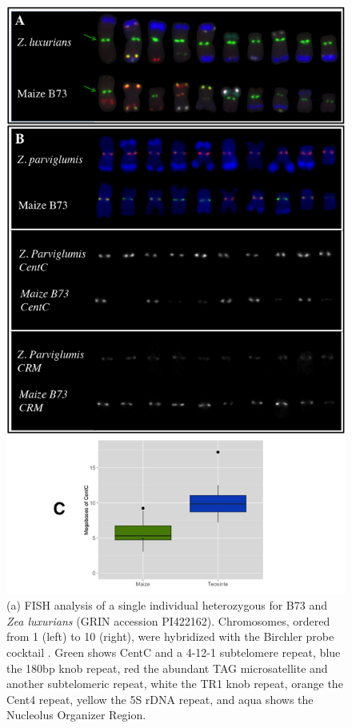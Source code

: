 \begin{figure}
\centering
\includegraphics[width=1\textwidth]{Fig4_kelly2}
\caption{(a) FISH analysis of a single individual heterozygous for B73 and \emph{Zea luxurians} (GRIN accession PI422162).
Chromosomes, ordered from 1 (left) to 10 (right), were hybridized with the Birchler probe cocktail \citep{kato2004paint}. 
Green shows CentC and a 4-12-1 subtelomere repeat, blue the 180bp knob repeat, red the abundant TAG microsatellite and another subtelomeric repeat, white the TR1 knob repeat, orange the Cent4 repeat, yellow the 5S rDNA repeat, and aqua shows the Nucleolus Organizer Region.
}
\end{figure}
